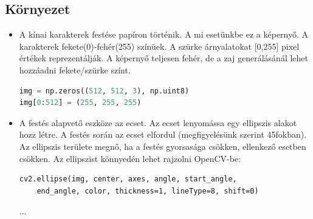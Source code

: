 \subsection{Környezet}
\begin{itemize}
\item A kínai karakterek festése papíron történik. A mi esetünkbe ez a képernyő. A karakterek fekete(0)-fehér(255) színüek. A szürke árnyalatokat [0,255] pixel értékek reprezentálják. A képernyő teljesen fehér, de a zaj generálásánál lehet hozzáadni fekete/szürke színt. 
\begin{lstlisting}[language=Python]
img = np.zeros((512, 512, 3), np.uint8)
img[0:512] = (255, 255, 255)
\end{lstlisting}
\item A festés alapvető eszköze az ecset. Az ecset lenyomássa egy ellipszis alakot hozz létre. A festés során az ecset elfordul (megfigyelésünk szerint 45fokban). Az ellipszis területe megnő, ha a festés gyorsasága csökken, ellenkező esetben csökken. Az ellipszist könnyedén lehet rajzolni OpenCV-be:
\begin{lstlisting}
cv2.ellipse(img, center, axes, angle, start_angle, 
	end_angle, color, thickness=1, lineType=8, shift=0) 
\end{lstlisting}
...
\end{itemize}

